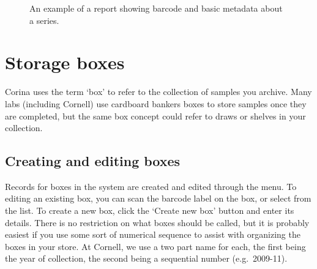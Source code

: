 \begin{figure}[p]
  \centering
    \setlength\fboxsep{0pt}
    \setlength\fboxrule{0.5pt}
    \caption{An example of a report showing barcode and basic metadata about a series.  }
    \label{fig:seriesreport}
\end{figure}


\section{Storage boxes}
\label{txt:assignToBox}
Corina uses the term `box' to refer to the collection of samples you archive.  Many labs (including Cornell) use cardboard bankers boxes to store samples once they are completed, but the same box concept could refer to draws or shelves in your collection.

\subsection{Creating and editing boxes}
Records for boxes in the system are created and edited through the  menu.  To editing an existing box, you can scan the barcode label on the box, or select from the list.  To create a new box, click the `Create new box' button and enter its details.  There is no restriction on what boxes should be called, but it is probably easiest if you use some sort of numerical sequence to assist with organizing the boxes in your store.  At Cornell, we use a two part name for each, the first being the year of collection, the second being a sequential number (e.g.\ 2009-11).


